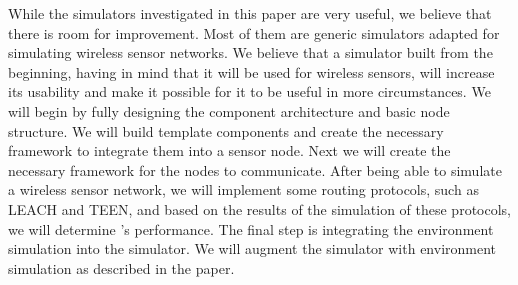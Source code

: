 
While the simulators investigated in this paper are very useful, we believe
that there is room for improvement. Most of them are generic simulators
adapted for simulating wireless sensor networks. 
We believe that a simulator built from the beginning, having in mind that it
will be used for wireless sensors, will increase its usability and make it
possible for it to be useful in more circumstances.
We will begin by fully designing the component architecture and basic node
structure. We will build template components and create the necessary framework to integrate them 
into a sensor node. Next we will create the necessary framework for the nodes
to communicate. 
After being able to simulate a wireless sensor network, we will implement some
routing protocols, such as LEACH and TEEN, and based on the results of the
simulation of these protocols, we will determine \codename's performance.
The final step is integrating the environment simulation into the simulator.
We will augment the simulator with environment simulation as described in the paper.
